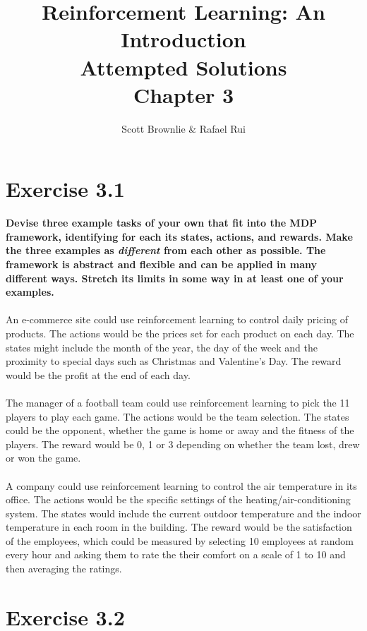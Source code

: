 \documentclass[a4paper,11pt]{article}
\title{Reinforcement Learning: An Introduction \\ Attempted Solutions \\ Chapter 3}
\author{Scott Brownlie \& Rafael Rui}
\date{}
\numberwithin{equation}{section}
\theoremstyle{remark}
\begin{document}
\maketitle

\section{Exercise 3.1}

\textbf{Devise three example tasks of your own that fit into the MDP framework, identifying for each its states, actions, and rewards. Make the three examples as \emph{different} from each other as possible. The framework is abstract and flexible and can be applied in many different ways. Stretch its limits in some way in at least one of your examples.}
\\ \\
An e-commerce site could use reinforcement learning to control daily pricing of products. The actions would be the prices set for each product on each day. The states might include the month of the year, the day of the week and the proximity to special days such as Christmas and Valentine's Day. The reward would be the profit at the end of each day.
\\ \\
The manager of a football team could use reinforcement learning to pick the 11 players to play each game. The actions would be the team selection. The states could be the opponent, whether the game is home or away and the fitness of the players. The reward would be 0, 1 or 3 depending on whether the team lost, drew or won the game.  
\\ \\
A company could use reinforcement learning to control the air temperature in its office. The actions would be the specific settings of the heating/air-conditioning system. The states would include the current outdoor temperature and the indoor temperature in each room in the building. The reward would be the satisfaction of the employees, which could be measured by selecting 10 employees at random every hour and asking them to rate the their comfort on a scale of 1 to 10 and then averaging the ratings.


\section{Exercise 3.2}
\end{document}
